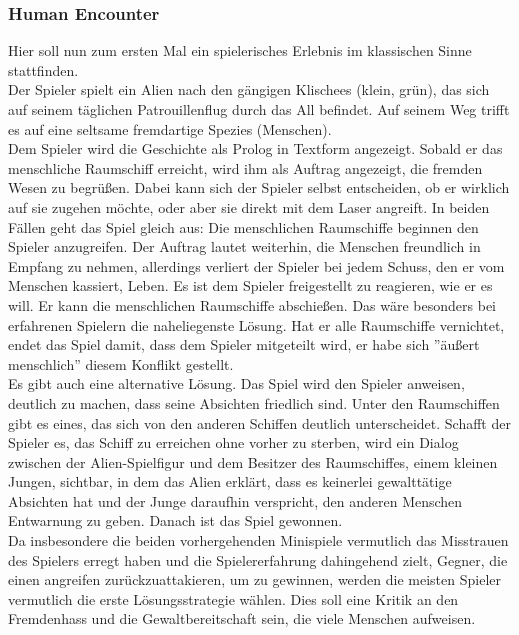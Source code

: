 \documentclass{Ausarbeitung}
\begin{document}
		\subsubsection{Human Encounter}
			Hier soll nun zum ersten Mal ein spielerisches Erlebnis im klassischen Sinne stattfinden. \\
			Der Spieler spielt ein Alien nach den gängigen Klischees (klein, grün), das sich auf seinem täglichen Patrouillenflug durch das All befindet. Auf seinem Weg trifft es auf eine seltsame fremdartige Spezies (Menschen). \\
			Dem Spieler wird die Geschichte als Prolog in Textform angezeigt. Sobald er das menschliche Raumschiff erreicht, wird ihm als Auftrag angezeigt, die fremden Wesen zu begrüßen. Dabei kann sich der Spieler selbst entscheiden, ob er wirklich auf sie zugehen möchte, oder aber sie direkt mit dem Laser angreift. In beiden Fällen geht das Spiel gleich aus: Die menschlichen Raumschiffe beginnen den Spieler anzugreifen. Der Auftrag lautet weiterhin, die Menschen freundlich in Empfang zu nehmen, allerdings verliert der Spieler bei jedem Schuss, den er vom Menschen kassiert, Leben. Es ist dem Spieler freigestellt zu reagieren, wie er es will. Er kann die menschlichen Raumschiffe abschießen. Das wäre besonders bei erfahrenen Spielern die naheliegenste Lösung. Hat er alle Raumschiffe vernichtet, endet das Spiel damit, dass dem Spieler mitgeteilt wird, er habe sich ''äußert menschlich'' diesem Konflikt gestellt. \\
			Es gibt auch eine alternative Lösung. Das Spiel wird den Spieler anweisen, deutlich zu machen, dass seine Absichten friedlich sind. Unter den Raumschiffen gibt es eines, das sich von den anderen Schiffen deutlich unterscheidet. Schafft der Spieler es, das Schiff zu erreichen ohne vorher zu sterben, wird ein Dialog zwischen der Alien-Spielfigur und dem Besitzer des Raumschiffes, einem kleinen Jungen, sichtbar, in dem das Alien erklärt, dass es keinerlei gewalttätige Absichten hat und der Junge daraufhin verspricht, den anderen Menschen Entwarnung zu geben. Danach ist das Spiel gewonnen. \\
			Da insbesondere die beiden vorhergehenden Minispiele vermutlich das Misstrauen des Spielers erregt haben und die Spielererfahrung dahingehend zielt, Gegner, die einen angreifen zurückzuattakieren, um zu gewinnen, werden die meisten Spieler vermutlich die erste Lösungsstrategie wählen. Dies soll eine Kritik an den Fremdenhass und die Gewaltbereitschaft sein, die viele Menschen aufweisen.
			
\end{document}
